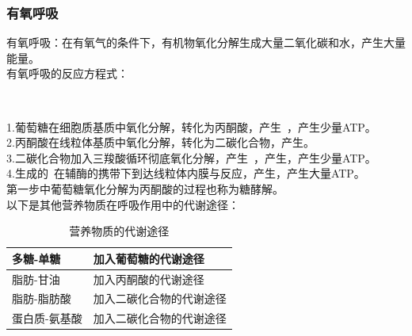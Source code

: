 \documentclass[UTF8]{ctexart}
\begin{document}
\subsubsection{有氧呼吸}
    有氧呼吸：在有氧气的条件下，有机物氧化分解生成大量二氧化碳和水，产生大量能量。\\[3mm]
    有氧呼吸的反应方程式：
    \begin{center}
        \\[4mm]
    \end{center}
    1.葡萄糖在细胞质基质中氧化分解，转化为丙酮酸，产生~，产生少量ATP。\\[3mm]
    2.丙酮酸在线粒体基质中氧化分解，转化为二碳化合物，产生。\\[3mm]
    3.二碳化合物加入三羧酸循环彻底氧化分解，产生~，产生，产生少量ATP。\\[3mm]
    4.生成的~在辅酶的携带下到达线粒体内膜与反应，产生，产生大量ATP。\\[3mm]
    第一步中葡萄糖氧化分解为丙酮酸的过程也称为糖酵解。\\[5mm]
    以下是其他营养物质在呼吸作用中的代谢途径：\vspace{5pt}
    \begin{table}[h]
        \begin{center}
            \begin{tabular}{l|l}
                \hline
                多糖-单糖\qquad\qquad&加入葡萄糖的代谢途径\qquad\qquad\\ \hline
                脂肪-甘油\qquad\qquad&加入丙酮酸的代谢途径\qquad\qquad\\ \hline
                脂肪-脂肪酸\qquad\qquad&加入二碳化合物的代谢途径\qquad\qquad\\ \hline
                蛋白质-氨基酸\qquad\qquad&加入二碳化合物的代谢途径\qquad\qquad\\ \hline
            \end{tabular}
            \caption{营养物质的代谢途径}
        \end{center}
    \end{table}

\newpage
\end{document}
